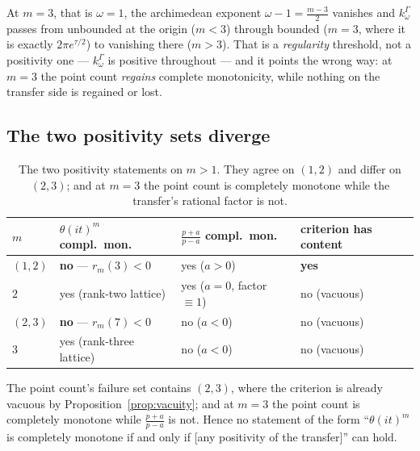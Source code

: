 \begin{remark}\label{rem:regularity}
At $m=3$, that is $\omega=1$, the archimedean exponent $\omega-1=\frac{m-3}2$
vanishes and $k^\Gamma_\omega$ passes from unbounded at the origin ($m<3$)
through bounded ($m=3$, where it is exactly $2\pi e^{\tau/2}$) to vanishing there
($m>3$). That is a \emph{regularity} threshold, not a positivity one ---
$k^\Gamma_\omega$ is positive throughout --- and it points the wrong way: at
$m=3$ the point count \emph{regains} complete monotonicity, while nothing on the
transfer side is regained or lost.
\end{remark}

\subsection{The two positivity sets diverge}\label{sec:divergence}

\begin{table}[ht]\centering\small
\caption{The two positivity statements on $m>1$. They agree on $(1,2)$ and
differ on $(2,3)$; and at $m=3$ the point count is completely monotone while the
transfer's rational factor is not.}\label{tab:divergence}
\begin{tabular}{@{}llll@{}}
\toprule
$m$ & $\theta(it)^{m}$ compl.\ mon. & $\frac{p+a}{p-a}$ compl.\ mon. & criterion has content\\
\midrule
$(1,2)$ & \textbf{no} --- $r_m(3)<0$ & yes ($a>0$) & \textbf{yes}\\
$2$ & yes (rank-two lattice) & yes ($a=0$, factor $\equiv1$) & no (vacuous)\\
$(2,3)$ & \textbf{no} --- $r_m(7)<0$ & no ($a<0$) & no (vacuous)\\
$3$ & yes (rank-three lattice) & no ($a<0$) & no (vacuous)\\
\bottomrule
\end{tabular}
\end{table}

\begin{corollary}[No equivalence]\label{cor:noequiv}
The point count's failure set contains $(2,3)$, where the criterion is already
vacuous by Proposition~\ref{prop:vacuity}; and at $m=3$ the point count is
completely monotone while $\frac{p+a}{p-a}$ is not. Hence no statement of the
form ``$\theta(it)^{m}$ is completely monotone if and only if [any positivity of
the transfer]'' can hold.
\end{corollary}

